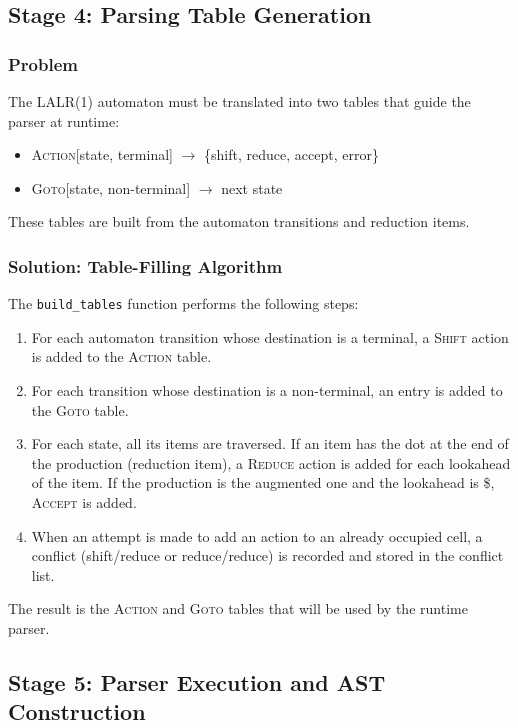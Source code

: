 \documentclass[12pt,a4paper]{report}
\begin{document}
\subsection{Stage 4: Parsing Table Generation}

\subsubsection{Problem}
The LALR(1) automaton must be translated into two tables that guide the parser at runtime:
\begin{itemize}
    \item \textsc{Action}[state, terminal] $\to$ \{shift, reduce, accept, error\}
    \item \textsc{Goto}[state, non-terminal] $\to$ next state
\end{itemize}

These tables are built from the automaton transitions and reduction items.

\subsubsection{Solution: Table-Filling Algorithm}
The \texttt{build\_tables} function performs the following steps:

\begin{enumerate}
    \item For each automaton transition whose destination is a terminal, a \textsc{Shift} action is added to the \textsc{Action} table.
    \item For each transition whose destination is a non-terminal, an entry is added to the \textsc{Goto} table.
    \item For each state, all its items are traversed. If an item has the dot at the end of the production (reduction item), a \textsc{Reduce} action is added for each lookahead of the item.
    If the production is the augmented one and the lookahead is \$, \textsc{Accept} is added.
    \item When an attempt is made to add an action to an already occupied cell, a conflict (shift/reduce or reduce/reduce) is recorded and stored in the conflict list.
\end{enumerate}

The result is the \textsc{Action} and \textsc{Goto} tables that will be used by the runtime parser.

\subsection{Stage 5: Parser Execution and AST Construction}
\end{document}
